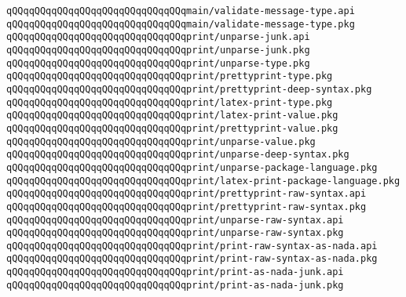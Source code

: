\verb|qQQqqQQqqQQqqQQqqQQqqQQqqQQqqQQqmain/validate-message-type.api|\newline
\verb|qQQqqQQqqQQqqQQqqQQqqQQqqQQqqQQqmain/validate-message-type.pkg|\newline
\newline
\verb|qQQqqQQqqQQqqQQqqQQqqQQqqQQqqQQqprint/unparse-junk.api|\newline
\verb|qQQqqQQqqQQqqQQqqQQqqQQqqQQqqQQqprint/unparse-junk.pkg|\newline
\verb|qQQqqQQqqQQqqQQqqQQqqQQqqQQqqQQqprint/unparse-type.pkg|\newline
\verb|qQQqqQQqqQQqqQQqqQQqqQQqqQQqqQQqprint/prettyprint-type.pkg|\newline
\verb|qQQqqQQqqQQqqQQqqQQqqQQqqQQqqQQqprint/prettyprint-deep-syntax.pkg|\newline
\verb|qQQqqQQqqQQqqQQqqQQqqQQqqQQqqQQqprint/latex-print-type.pkg|\newline
\verb|qQQqqQQqqQQqqQQqqQQqqQQqqQQqqQQqprint/latex-print-value.pkg|\newline
\verb|qQQqqQQqqQQqqQQqqQQqqQQqqQQqqQQqprint/prettyprint-value.pkg|\newline
\verb|qQQqqQQqqQQqqQQqqQQqqQQqqQQqqQQqprint/unparse-value.pkg|\newline
\verb|qQQqqQQqqQQqqQQqqQQqqQQqqQQqqQQqprint/unparse-deep-syntax.pkg|\newline
\verb|qQQqqQQqqQQqqQQqqQQqqQQqqQQqqQQqprint/unparse-package-language.pkg|\newline
\verb|qQQqqQQqqQQqqQQqqQQqqQQqqQQqqQQqprint/latex-print-package-language.pkg|\newline
\verb|qQQqqQQqqQQqqQQqqQQqqQQqqQQqqQQqprint/prettyprint-raw-syntax.api|\newline
\verb|qQQqqQQqqQQqqQQqqQQqqQQqqQQqqQQqprint/prettyprint-raw-syntax.pkg|\newline
\verb|qQQqqQQqqQQqqQQqqQQqqQQqqQQqqQQqprint/unparse-raw-syntax.api|\newline
\verb|qQQqqQQqqQQqqQQqqQQqqQQqqQQqqQQqprint/unparse-raw-syntax.pkg|\newline
\verb|qQQqqQQqqQQqqQQqqQQqqQQqqQQqqQQqprint/print-raw-syntax-as-nada.api|\newline
\verb|qQQqqQQqqQQqqQQqqQQqqQQqqQQqqQQqprint/print-raw-syntax-as-nada.pkg|\newline
\verb|qQQqqQQqqQQqqQQqqQQqqQQqqQQqqQQqprint/print-as-nada-junk.api|\newline
\verb|qQQqqQQqqQQqqQQqqQQqqQQqqQQqqQQqprint/print-as-nada-junk.pkg|\newline
